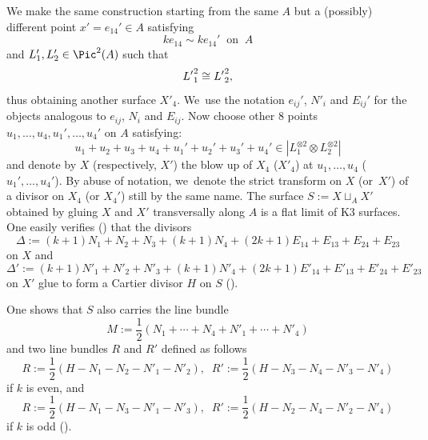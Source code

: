 \begin{center}
\end{center}

We make the same construction starting from the same $A$ but a (possibly) different point $x'=e_{14}'\in A$ satisfying
\begin{equation}\label{drei}
ke_{14} \sim ke_{14}' \;
\; \mbox{on} \; \; A
\end{equation}
and $L'_1, L'_2 \in \Pic^2(A)$ such that
\begin{equation}\label{zwei}{L'}_1^{\*2} \cong {L'}_2^{\*2},\end{equation}
thus obtaining another surface $X'_4$. We~use the notation $e_{ij}'$,
$N'_i$ and $E_{ij}'$ for the objects analogous to $e_{ij}$,
$N_i$ and $E_{ij}$.
Now choose other $8$ points $u_{1},\ldots,u_{4}, u_{1}',\ldots,u_{4}'$ on $A$
satisfying:
\[
u_1+u_2+u_3+u_4+u_1'+u_2'+u_3'+u_4'\in |L_1^{\otimes2}\otimes L_2^{\otimes 2}|
\]
and denote by $X$ (respectively, $X'$) the blow up of $X_4$ (\resp $X'_4$) at $u_{1},\ldots,u_{4}$ (\resp $u_{1}',\ldots,u_{4}'$). By abuse of notation, we~denote the strict transform on $X$ (or~$X'$) of a divisor on $X_4$ (or $X_4'$) still by the same name. The surface $S:= X \sqcup_{A} X'$ obtained by gluing $X$ and $X'$ transversally along $A$ is a flat limit of K3 surfaces.
One easily verifies (\cf \cite[Lem.\,5.1]{KLV1}) that the divisors
\[
 \Delta:= (k+1)N_1+N_2+N_3+(k+1)N_4+(2k+1)E_{14}+E_{13}+E_{24}+E_{23}
\]
on $X$ and
\[
 \Delta':=(k+1)N'_1+N'_2+N'_3+(k+1)N'_4+(2k+1)E'_{14}+E'_{13}+E'_{24}+E'_{23}
\]
on $X'$ glue to form a Cartier divisor $H$ on $S$ (\cf \cite[(35)]{KLV1}).

One shows that $S$ also carries the line bundle
\[
 M:=\frac{1}{2}\left(N_1+\cdots+N_4+N'_1+\cdots+N'_4\right)
\]
and two line bundles $R$ and $R'$ defined as follows
\begin{equation}
\label{eq:keven}
R:=\frac{1}{2}\left(H-N_1-N_2-N'_1-N'_2\right), \; \; R':=\frac{1}{2}\left(H-N_3-N_4-N'_3-N'_4\right)
\end{equation}
if $k$ is even, and
\begin{equation}\label{eq:kodd}
R:=\frac{1}{2}\left(H-N_1-N_3-N'_1-N'_3\right), \; \; R':=\frac{1}{2}\left(H-N_2-N_4-N'_2-N'_4\right)
\end{equation}
if $k$ is odd (\cf \cite[p.\,26]{KLV1}).

